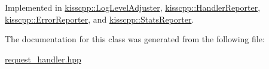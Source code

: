 Implemented in \hyperlink{classkisscpp_1_1_log_level_adjuster_a971d59364d21bbaa283ea520caefa604}{kisscpp\-::\-Log\-Level\-Adjuster}, \hyperlink{classkisscpp_1_1_handler_reporter_a5085be2e4dcfa1e98bf517c8d0b5443f}{kisscpp\-::\-Handler\-Reporter}, \hyperlink{classkisscpp_1_1_error_reporter_a7afc458c0a447f93f138f006acb57117}{kisscpp\-::\-Error\-Reporter}, and \hyperlink{classkisscpp_1_1_stats_reporter_af57d8c01b118a4693b8b226c3f9dbbe5}{kisscpp\-::\-Stats\-Reporter}.



The documentation for this class was generated from the following file\-:\begin{DoxyCompactItemize}
\item 
\hyperlink{request__handler_8hpp}{request\-\_\-handler.\-hpp}\end{DoxyCompactItemize}
